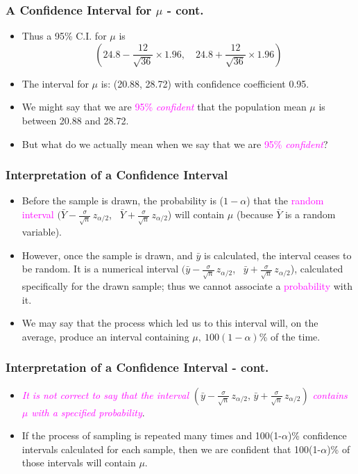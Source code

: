 \documentclass[xcolor=dvipsnames,12pt]{beamer}
\begin{document}
\begin{frame}
\frametitle{A Confidence  Interval for {\boldmath$\mu$} - cont.}
\begin{itemize}
\item Thus a 95\% C.I. for $\mu$ is
$$
  \left( 24.8 - \frac{12}{\sqrt{36}} \times 1.96, \quad
         24.8 + \frac{12}{\sqrt{36}} \times  1.96 \right)
$$ 

\item The interval for $\mu$ is: (20.88, 28.72) with confidence coefficient 0.95. 
 
\item We might say that we are \textcolor{magenta}{95\% \textit{confident}} that the population mean $\mu$ is
between 20.88 and 28.72.

\item But what do we actually mean when we say that we are \textcolor{magenta}{95\% \textit{confident}}?
\end{itemize}
\end{frame}


\begin{frame}
\frametitle{Interpretation of a Confidence Interval}
\begin{itemize}
\item Before the sample is drawn,
the probability is ($1-\alpha$) that the \textcolor{magenta}{random interval}
$(\bar{Y} - \frac{\sigma}{\sqrt{n}} \, z_{\alpha/2}$, \
$ \bar{Y} + \frac{\sigma}{\sqrt{n}} \, z_{\alpha/2}$) 
will contain $\mu$ (because $\bar{Y}$ is a random variable).
\item However, once the sample is drawn, and $\bar{y}$ is  
calculated, the interval ceases to be random. It is
a numerical interval 
$(\bar{y} - \frac{\sigma}{\sqrt{n}} \, z_{\alpha/2}$, \
$ \bar{y} + \frac{\sigma}{\sqrt{n}} \, z_{\alpha/2}$), 
calculated specifically for the drawn sample; thus we cannot associate a \textcolor{magenta}{probability} with it.
\item We may say that the process which led us to this interval will, on the average, produce an
interval containing $\mu,\  100 (1-\alpha)$\% of the time.
\end{itemize}
\end{frame}


\begin{frame}
\frametitle{Interpretation of a Confidence Interval - cont.}
\begin{itemize}
\item \textcolor{magenta}{\emph{It is not correct to say that the interval}}
$(\bar{y} - \frac{\sigma}{\sqrt{n}} \, z_{\alpha/2},\,
\bar{y} + \frac{\sigma}{\sqrt{n}} \, z_{\alpha/2})$
\textcolor{magenta}{\emph{contains $\mu$ with a specified probability}}.  

\item  If the process of sampling is repeated many times and 100(1-$\alpha$)\% confidence intervals calculated for each sample, 
then we are confident that  100(1-$\alpha$)\% of those intervals will contain $\mu$.
\end{itemize}
\end{frame}
\end{document}
